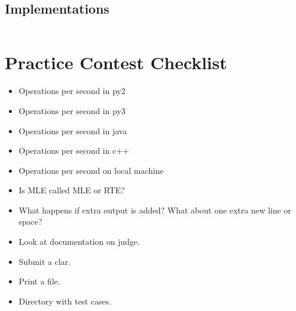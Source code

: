 \documentclass[8pt,a4paper,landscape,oneside]{amsart}
\newcommand{\codep}[1]{\inputminted[fontsize=\large,tabsize=2,baselinestretch=1]{py}{code/#1}}
\begin{document}
\begin{multicols*}{2}
\begin{large}
    \subsection{Implementations}
        \codep{Geometry/geometry.py}
\newpage
\section{Practice Contest Checklist}
\begin{itemize}
    \item Operations per second in py2
    \item Operations per second in py3
    \item Operations per second in java
    \item Operations per second in c++
    \item Operations per second on local machine
    \item Is MLE called MLE or RTE?
    \item What happens if extra output is added? What about one extra new line or space?
    \item Look at documentation on judge.
    \item Submit a clar.
    \item Print a file.
    \item Directory with test cases.
\end{itemize}


\end{large}
\end{multicols*}
\end{document}
